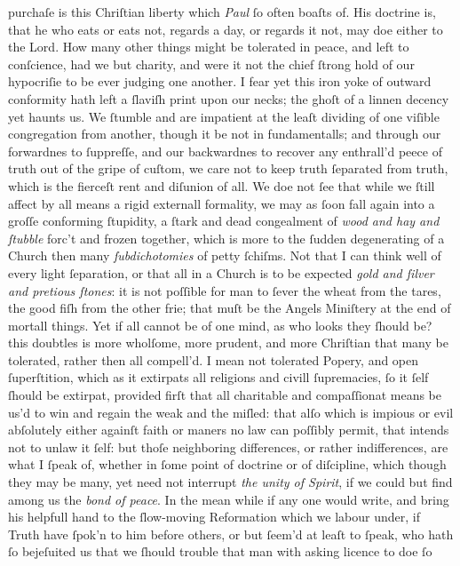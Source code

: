 purchaſe is this Chriſtian liberty which \textit{Paul} ſo often boaſts of.  His
doctrine is, that he who eats or eats not, regards a day, or regards it not, may
doe either to the Lord.  How many other things might be tolerated in peace, and
left to conſcience, had we but charity, and were it not the chief ſtrong hold of
our hypocriſie to be ever judging one another.  I fear yet this iron yoke of
outward conformity hath left a ſlaviſh print upon our necks; the ghoſt of a
linnen decency yet haunts us.  We ſtumble and are impatient at the leaſt
dividing of one viſible congregation from another, though it be not in
fundamentalls; and through our forwardnes to ſuppreſſe, and our backwardnes to
recover any enthrall'd peece of truth out of the gripe of cuſtom, we care not to
keep truth ſeparated from truth, which is the fierceſt rent and diſunion of all.
We doe not ſee that while we ſtill affect by all means a rigid externall
formality, we may as ſoon fall again into a groſſe conforming ſtupidity, a ſtark
and dead congealment of \textit{wood and hay and ſtubble} forc't and frozen
together, which is more to the ſudden degenerating of a Church then many
\textit{ſubdichotomies} of petty ſchiſms.  Not that I can think well of every
light ſeparation, or that all in a Church is to be expected \textit{gold and
ſilver and pretious ſtones}: it is not poſſible for man to ſever the wheat from
the tares, the good fiſh from the other frie; that muſt be the Angels Miniſtery
at the end of mortall things.  Yet if all cannot be of one mind, as who looks
they ſhould be? this doubtles is more wholſome, more prudent, and more Chriſtian
that many be tolerated, rather then all compell'd.  I mean not tolerated Popery,
and open ſuperſtition, which as it extirpats all religions and civill
ſupremacies, ſo it ſelf ſhould be extirpat, provided firſt that all charitable
and compaſſionat means be us'd to win and regain the weak and the miſled: that
alſo which is impious or evil abſolutely either againſt faith or maners no law
can poſſibly permit, that intends not to unlaw it ſelf: but thoſe neighboring
differences, or rather indifferences, are what I ſpeak of, whether in ſome point
of doctrine or of diſcipline, which though they may be many, yet need not
interrupt \textit{the unity of Spirit}, if we could but find among us the
\textit{bond of peace}.  In the mean while if any one would write, and bring his
helpfull hand to the ſlow-moving Reformation which we labour under, if Truth
have ſpok'n to him before others, or but ſeem'd at leaſt to ſpeak, who hath ſo
bejeſuited us that we ſhould trouble that man with asking licence to doe ſo
